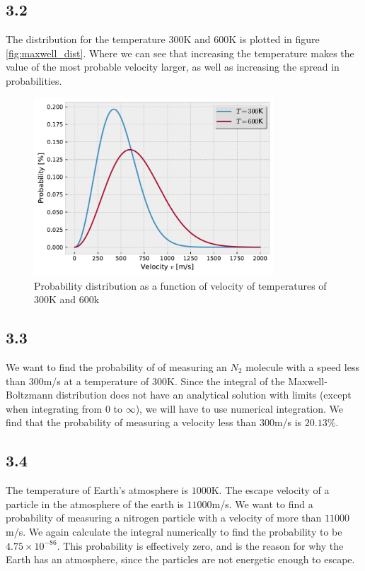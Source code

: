 \documentclass[a4paper,10pt, english]{article}
\begin{document}
\subsection*{3.2}
The distribution for the temperature $300$K and $600$K is plotted in figure \vref{fig:maxwell_dist}. Where we can see that increasing the temperature makes the value of the most probable velocity larger, as well as increasing the spread in probabilities.
\begin{figure}[h!]
  \centering
    \includegraphics[width=0.8\textwidth]{../figures/MaxwellDistribution.pdf}
    \caption{Probability distribution as a function of velocity of temperatures of $300$K and $600$k}
    \label{fig:maxwell_dist}
\end{figure}

\subsection*{3.3}
We want to find the probability of of measuring an $N_2$ molecule with a speed less than $300$m/s at a temperature of $300$K. Since the integral of the Maxwell-Boltzmann distribution does not have an analytical solution with limits (except when integrating from $0$ to $\infty$), we will have to use numerical integration. We find that the probability of measuring a velocity less than $300$m/s is $20.13$\%.

\subsection*{3.4}
The temperature of Earth's atmosphere is $1000$K. The escape velocity of a particle in the atmosphere of the earth is $11 000$m/s. We want to find a probability of measuring a nitrogen particle with a velocity of more than $11000$m/s. We again calculate the integral numerically to find the probability to be $4.75\times 10^{-86}$. This probability is effectively zero, and is the reason for why the Earth has an atmosphere, since the particles are not energetic enough to escape.
\end{document}
